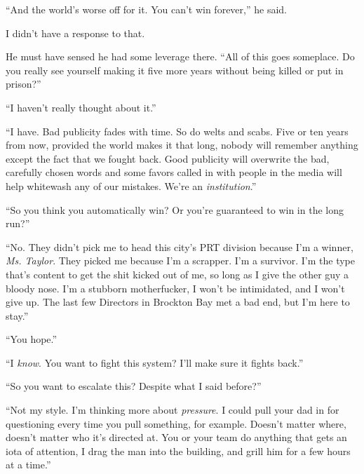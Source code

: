 ``And the world's worse off for it.  You can't win forever,'' he said.



I didn't have a response to that.



He must have sensed he had some leverage there.  ``All of this goes someplace.  Do you really see yourself making it five more years without being killed or put in prison?''



``I haven't really thought about it.''



``I have.  Bad publicity fades with time.  So do welts and scabs.  Five or ten years from now, provided the world makes it that long, nobody will remember anything except the fact that we fought back.  Good publicity will overwrite the bad, carefully chosen words and some favors called in with people in the media will help whitewash any of our mistakes.  We're an \emph{institution}.''



``So you think you automatically win?  Or you're guaranteed to win in the long run?''



``No.  They didn't pick me to head this city's PRT division because I'm a winner, \emph{Ms. Taylor}.  They picked me because I'm a scrapper.  I'm a survivor.  I'm the type that's content to get the shit kicked out of me, so long as I give the other guy a bloody nose.  I'm a stubborn motherfucker, I won't be intimidated, and I won't give up.  The last few Directors in Brockton Bay met a bad end, but I'm here to stay.''



``You hope.''



``I \emph{know}.  You want to fight this system?  I'll make sure it fights back.''



``So you want to escalate this?  Despite what I said before?''



``Not my style.  I'm thinking more about \emph{pressure}.  I could pull your dad in for questioning every time you pull something, for example.  Doesn't matter where, doesn't matter who it's directed at.  You or your team do anything that gets an iota of attention, I drag the man into the building, and grill him for a few hours at a time.''



